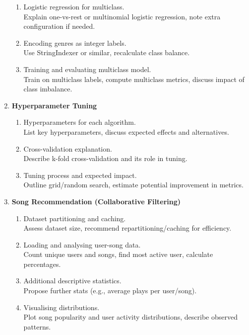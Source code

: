 \documentclass{article}
\begin{document}
\begin{enumerate}
\begin{enumerate}
      \item Logistic regression for multiclass.\\
      Explain one-vs-rest or multinomial logistic regression, note extra configuration if needed.
      \item Encoding genres as integer labels.\\
      Use StringIndexer or similar, recalculate class balance.
      \item Training and evaluating multiclass model.\\
      Train on multiclass labels, compute multiclass metrics, discuss impact of class imbalance.
    \end{enumerate}
  \item \textbf{Hyperparameter Tuning}
    \begin{enumerate}
      \item Hyperparameters for each algorithm.\\
      List key hyperparameters, discuss expected effects and alternatives.
      \item Cross-validation explanation.\\
      Describe k-fold cross-validation and its role in tuning.
      \item Tuning process and expected impact.\\
      Outline grid/random search, estimate potential improvement in metrics.
    \end{enumerate}
  \item \textbf{Song Recommendation (Collaborative Filtering)}
    \begin{enumerate}
      \item Dataset partitioning and caching.\\
      Assess dataset size, recommend repartitioning/caching for efficiency.
      \item Loading and analysing user-song data.\\
      Count unique users and songs, find most active user, calculate percentages.
      \item Additional descriptive statistics.\\
      Propose further stats (e.g., average plays per user/song).
      \item Visualising distributions.\\
      Plot song popularity and user activity distributions, describe observed patterns.
    \end{enumerate}
\end{enumerate}
\end{document}

